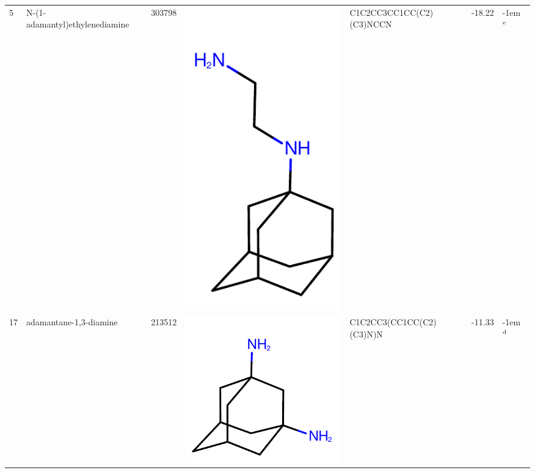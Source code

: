 \documentclass[aps,pre,twocolumn,nofootinbib,superscriptaddress,10pt, final,tightenlines]{revtex4-1}
\begin{document}
\begin{table}
\begin{tabular}{lllp{1.5cm}>{\ttfamily}lS[table-format=-1.2, table-figures-uncertainty=1]l}
5  & N-(1-adamantyl)ethylenediamine     & 303798    & \parbox[c]{1em}{\includegraphics[scale=0.2]{figures/303798.pdf}}    & C1C2CC3CC1CC(C2)(C3)NCCN                     & -18.22  & \kern-1em {$^{\rm e}$}  \\
17 & adamantane-1,3-diamine             & 213512    & \parbox[c]{1em}{\includegraphics[scale=0.2]{figures/213512.pdf}}    & C1C2CC3(CC1CC(C2)(C3)N)N                     & -11.33  & \kern-1em {$^{\rm d}$}  \\

\end{tabular}
\end{table}
\end{document}
